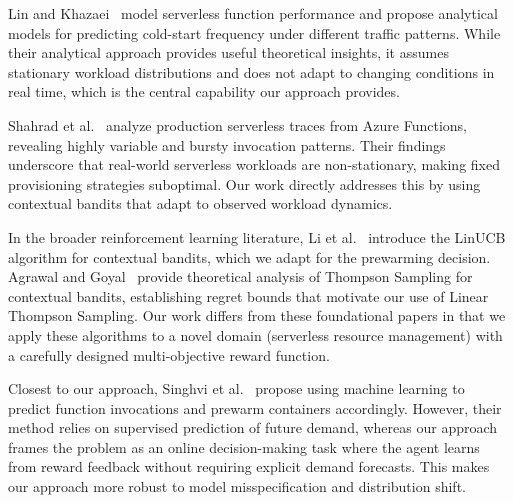 \documentclass[11pt]{article}
\begin{document}
Lin and Khazaei~\cite{lin2020} model serverless function performance and propose analytical models for predicting cold-start frequency under different traffic patterns. While their analytical approach provides useful theoretical insights, it assumes stationary workload distributions and does not adapt to changing conditions in real time, which is the central capability our approach provides.

Shahrad et al.~\cite{shahrad2020} analyze production serverless traces from Azure Functions, revealing highly variable and bursty invocation patterns. Their findings underscore that real-world serverless workloads are non-stationary, making fixed provisioning strategies suboptimal. Our work directly addresses this by using contextual bandits that adapt to observed workload dynamics.

In the broader reinforcement learning literature, Li et al.~\cite{li2010} introduce the LinUCB algorithm for contextual bandits, which we adapt for the prewarming decision. Agrawal and Goyal~\cite{agrawal2013} provide theoretical analysis of Thompson Sampling for contextual bandits, establishing regret bounds that motivate our use of Linear Thompson Sampling. Our work differs from these foundational papers in that we apply these algorithms to a novel domain (serverless resource management) with a carefully designed multi-objective reward function.

Closest to our approach, Singhvi et al.~\cite{singhvi2021} propose using machine learning to predict function invocations and prewarm containers accordingly. However, their method relies on supervised prediction of future demand, whereas our approach frames the problem as an online decision-making task where the agent learns from reward feedback without requiring explicit demand forecasts. This makes our approach more robust to model misspecification and distribution shift.
\end{document}

